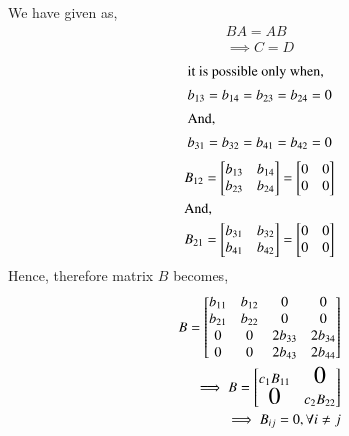 \documentclass[journal,12pt,twocolumn]{IEEEtran}
\begin{document}
We have given as,
\begin{align}
BA = AB\\
\implies C = D
\end{align}
\begin{align}
\intertext{it is possible only when,}
b_{13}= b_{14} = b_{23}= b_{24} = 0 \\
\intertext{And,}
 b_{31} = b_{32} = b_{41} = b_{42} = 0
 \end{align}
 \begin{align}
B_{12} =  \begin{bmatrix}
b_{13} & b_{14}\\ 
b_{23}  & b_{24}  
\end{bmatrix} =  \begin{bmatrix}
0 & 0\\ 
0  & 0  
\end{bmatrix}\\ 
\intertext{And,}
B_{21} =  \begin{bmatrix}
b_{31} & b_{32}\\
b_{41}  & b_{42}  
\end{bmatrix}  =  \begin{bmatrix}
0 & 0\\ 
0  & 0  
\end{bmatrix} 
\end{align}
Hence, therefore matrix $B$ becomes,
\begin{align}
B =  \begin{bmatrix}
b_{11} & b_{12}  & 0       & 0 \\ 
b_{21} & b_{22}  & 0       & 0  \\
0      & 0       & 2b_{33} & 2b_{34}  \\
0      & 0       & 2b_{43} & 2b_{44}    
\end{bmatrix}\\
\implies B =  \begin{bmatrix}
c_1B_{11} &\bigZero  \\ 
\bigZero   & c_2B_{22}  
\end{bmatrix}\\
\implies B_{ij} = 0, \forall i \neq j
\end{align}
\end{document}
